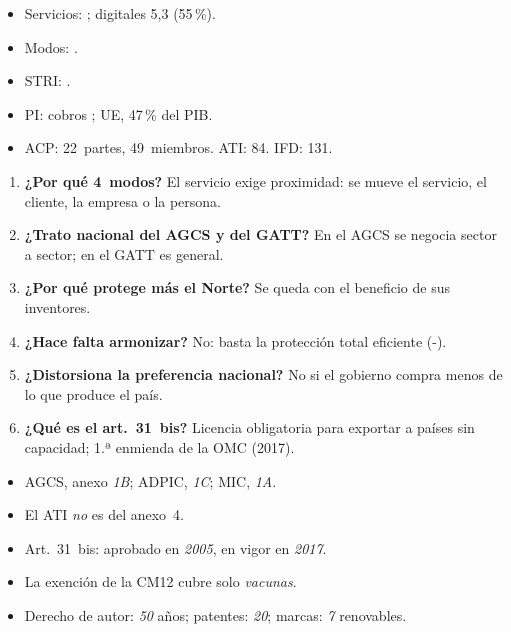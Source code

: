 \documentclass{article}
\begin{document}
\begin{columnas}
\anexorepaso
{}
\begin{itemize}
\item Servicios: ; digitales 5,3 (55\,\%).
\item Modos: .
\item STRI: .
\item PI: cobros ; UE, 47\,\% del PIB.
\item ACP: 22~partes, 49~miembros. ATI: 84. IFD: 131.
\end{itemize}
\begin{enumerate}
\item \textbf{¿Por qué 4~modos?} El servicio exige proximidad: se mueve el servicio, el cliente, la empresa o la persona.
\item \textbf{¿Trato nacional del AGCS y del GATT?} En el AGCS se negocia sector a sector; en el GATT es general.
\item \textbf{¿Por qué protege más el Norte?} Se queda con el beneficio de sus inventores.
\item \textbf{¿Hace falta armonizar?} No: basta la protección total eficiente (-).
\item \textbf{¿Distorsiona la preferencia nacional?} No si el gobierno compra menos de lo que produce el país.
\item \textbf{¿Qué es el art.~31~bis?} Licencia obligatoria para exportar a países sin capacidad; 1.ª enmienda de la OMC (2017).
\end{enumerate}
\begin{trampa}
\begin{itemize}
\item AGCS, anexo \emph{1B}; ADPIC, \emph{1C}; MIC, \emph{1A}.
\item El ATI \emph{no} es del anexo~4.
\item Art.~31~bis: aprobado en \emph{2005}, en vigor en \emph{2017}.
\item La exención de la CM12 cubre solo \emph{vacunas}.
\item Derecho de autor: \emph{50} años; patentes: \emph{20}; marcas: \emph{7} renovables.
\end{itemize}
\end{trampa}

\end{columnas}
\end{document}
